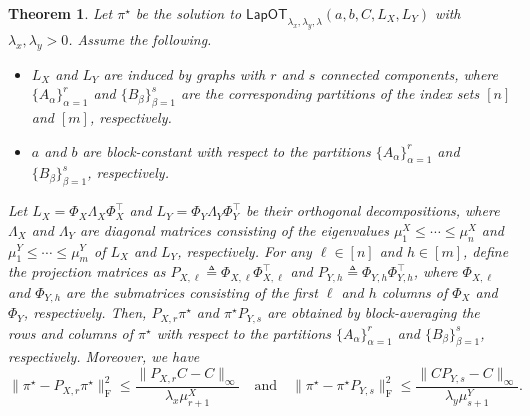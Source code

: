 \documentclass{article}
\newtheorem{theorem}{Theorem}
\theoremstyle{definition}
\begin{document}
\begin{theorem}
    \label{thm:optimal_coupling_projection_bound}
    Let $\pi^\star$ be the solution to $\mathsf{LapOT}_{\lambda_x, \lambda_y, \lambda}(a, b, C, L_X, L_Y)$ with $\lambda_x, \lambda_y > 0$. Assume the following.
    \begin{itemize}
        \item[(i)] $L_X$ and $L_Y$ are induced by graphs with $r$ and $s$ connected components, where $\{A_\alpha\}_{\alpha = 1}^{r}$ and $\{B_\beta\}_{\beta = 1}^{s}$ are the corresponding partitions of the index sets $[n]$ and $[m]$, respectively.
        \item[(ii)] $a$ and $b$ are block-constant with respect to the partitions $\{A_\alpha\}_{\alpha = 1}^{r}$ and $\{B_\beta\}_{\beta = 1}^{s}$, respectively.
    \end{itemize}
    Let $L_X = \Phi_X \Lambda_X \Phi_X^\top$ and $L_Y = \Phi_Y \Lambda_Y \Phi_Y^\top$ be their orthogonal decompositions, where $\Lambda_X$ and $\Lambda_Y$ are diagonal matrices consisting of the eigenvalues $\mu_1^X \le \cdots \le \mu_n^X$ and $\mu_1^Y \le \cdots \le \mu_m^Y$ of $L_X$ and $L_Y$, respectively. For any $\ell \in [n]$ and $h \in [m]$, define the projection matrices as $P_{X, \ell} \triangleq \Phi_{X, \ell} \Phi_{X, \ell}^\top$ and $P_{Y, h} \triangleq \Phi_{Y, h} \Phi_{Y, h}^\top$, where $\Phi_{X, \ell}$ and $\Phi_{Y, h}$ are the submatrices consisting of the first $\ell$ and $h$ columns of $\Phi_X$ and $\Phi_Y$, respectively. Then, $P_{X, r} \pi^\star$ and $\pi^\star P_{Y, s}$ are obtained by block-averaging the rows and columns of $\pi^\star$ with respect to the partitions $\{A_\alpha\}_{\alpha = 1}^{r}$ and $\{B_\beta\}_{\beta = 1}^{s}$, respectively. Moreover, we have
    \begin{equation}
        \label{eq:optimal_coupling_projection_bound}
        \|\pi^\star - P_{X, r} \pi^\star\|_{\mathrm{F}}^2 \le \frac{\|P_{X, r} C - C\|_\infty}{\lambda_x \mu_{r + 1}^X} \quad \text{and} \quad \|\pi^\star - \pi^\star P_{Y, s}\|_{\mathrm{F}}^2 \le \frac{\|C P_{Y, s} - C\|_\infty}{\lambda_y \mu_{s + 1}^Y}.
    \end{equation}
\end{theorem}
\end{document}
